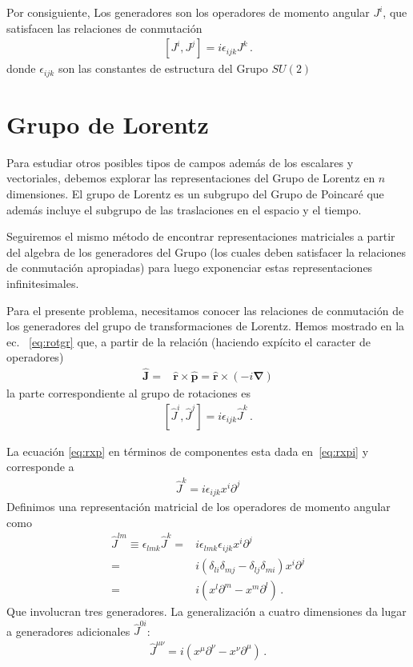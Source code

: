 Por consiguiente, Los generadores son los operadores de momento angular $ J^i$, que satisfacen las relaciones de conmutación
\begin{align}
\label{eq:rotgr}
  \left[J^i,J^j\right]=i\epsilon_{ijk}J^k\,.
\end{align}
donde $\epsilon_{ijk}$ son las constantes de estructura del Grupo $SU(2)$

\section{Grupo de Lorentz }
Para estudiar otros posibles tipos de campos además de los escalares y vectoriales, debemos explorar las representaciones del Grupo de Lorentz en $n$ dimensiones. El grupo de Lorentz es un subgrupo del Grupo de Poincaré que además incluye el subgrupo de las traslaciones en el espacio y el tiempo.

Seguiremos el mismo método de encontrar representaciones matriciales a partir del algebra  de los generadores del Grupo (los cuales deben satisfacer la relaciones de conmutación apropiadas) para luego exponenciar estas representaciones infinitesimales.

Para el presente problema, necesitamos conocer las relaciones de conmutación de los generadores del grupo de transformaciones de Lorentz. Hemos mostrado en la ec.~ \eqref{eq:rotgr}  que, a partir de la relación (haciendo expícito el caracter de operadores)
\begin{align}
\label{eq:rxp}
  \widehat{\mathbf{J}}=&\widehat{\mathbf{r}}\times \widehat{\mathbf{p}}=
\widehat{\mathbf{r}}\times (-i\boldsymbol{\nabla})
\end{align}
la parte correspondiente al grupo de rotaciones es
\begin{align*}
  \left[\widehat{J}^i,\widehat{J}^j\right]=i\epsilon_{ijk}\widehat{J}^k\,.
\end{align*}

La ecuación \eqref{eq:rxp} en términos de componentes esta dada en~\eqref{eq:rxpi} y corresponde a
\begin{align}
  \widehat{J}^k=i\epsilon_{ijk}x^i\partial^j
\end{align}
Definimos una representación matricial de los operadores de momento angular como
\begin{align}
  \widehat{J}^{l m}\equiv\epsilon_{lmk}\widehat{J}^k=&i\epsilon_{lmk}\epsilon_{ijk}x^i\partial^j\nonumber\\
=&i(\delta_{li}\delta_{mj}-\delta_{lj}\delta_{mi})x^i\partial^j\nonumber\\
=&i(x^l\partial^m-x^m\partial^l)\,.
\end{align}
  Que involucran tres generadores. La generalización a cuatro dimensiones da lugar a generadores adicionales $\widehat{J}^{0i}$:
\begin{align}
  \widehat{J}^{\mu\nu}=i(x^\mu\partial^\nu-x^\nu\partial^\mu)\,.
\end{align}


